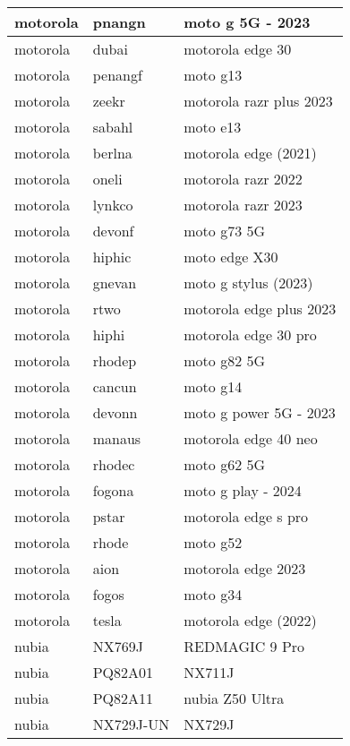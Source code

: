 \begin{tabularx}{\linewidth}{|l|X|X|}
        motorola & pnangn & moto g 5G - 2023 \\ \hline
        motorola & dubai & motorola edge 30 \\ \hline
        motorola & penangf & moto g13 \\ \hline
        motorola & zeekr & motorola razr plus 2023 \\ \hline
        motorola & sabahl & moto e13 \\ \hline
        motorola & berlna & motorola edge (2021) \\ \hline
        motorola & oneli & motorola razr 2022 \\ \hline
        motorola & lynkco & motorola razr 2023 \\ \hline
        motorola & devonf & moto g73 5G \\ \hline
        motorola & hiphic & moto edge X30 \\ \hline
        motorola & gnevan & moto g stylus (2023) \\ \hline
        motorola & rtwo & motorola edge plus 2023 \\ \hline
        motorola & hiphi & motorola edge 30 pro \\ \hline
        motorola & rhodep & moto g82 5G \\ \hline
        motorola & cancun & moto g14 \\ \hline
        motorola & devonn & moto g power 5G - 2023 \\ \hline
        motorola & manaus & motorola edge 40 neo \\ \hline
        motorola & rhodec & moto g62 5G \\ \hline
        motorola & fogona & moto g play - 2024 \\ \hline
        motorola & pstar & motorola edge s pro \\ \hline
        motorola & rhode & moto g52 \\ \hline
        motorola & aion & motorola edge 2023 \\ \hline
        motorola & fogos & moto g34 \\ \hline
        motorola & tesla & motorola edge (2022) \\ \hline
        nubia & NX769J & REDMAGIC 9 Pro \\ \hline
        nubia & PQ82A01 & NX711J \\ \hline
        nubia & PQ82A11 & nubia Z50 Ultra \\ \hline
        nubia & NX729J-UN & NX729J \\ \hline

\end{tabularx}
